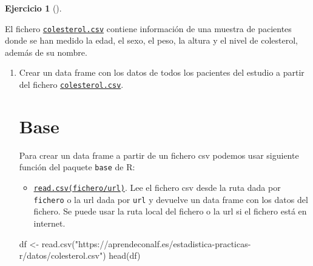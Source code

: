 \documentclass[
  a4paper,
]{scrreport}
\newenvironment{Shaded}{\begin{snugshade}}{\end{snugshade}}
\newcommand{\FunctionTok}[1]{\textcolor[rgb]{0.28,0.35,0.67}{#1}}
\newcommand{\NormalTok}[1]{\textcolor[rgb]{0.00,0.23,0.31}{#1}}
\newcommand{\OtherTok}[1]{\textcolor[rgb]{0.00,0.23,0.31}{#1}}
\newcommand{\StringTok}[1]{\textcolor[rgb]{0.13,0.47,0.30}{#1}}
\providecommand{\tightlist}{%
  \setlength{\itemsep}{0pt}\setlength{\parskip}{0pt}}\usepackage{longtable,booktabs,array}
\theoremstyle{definition}
\newtheorem{exercise}{Ejercicio}[chapter]
\theoremstyle{remark}
\begin{document}
\begin{exercise}[]\protect\hypertarget{exr-preprocesamiento-2}{}\label{exr-preprocesamiento-2}

El fichero \href{datos/colesterol.csv}{\texttt{colesterol.csv}} contiene
información de una muestra de pacientes donde se han medido la edad, el
sexo, el peso, la altura y el nivel de colesterol, además de su nombre.

\begin{enumerate}
\def\labelenumi{\alph{enumi}.}
\item
  Crear un data frame con los datos de todos los pacientes del estudio a
  partir del fichero
  \href{datos/colesterol.csv}{\texttt{colesterol.csv}}.

  \begin{tcolorbox}[enhanced jigsaw, colframe=quarto-callout-tip-color-frame, toprule=.15mm, bottomtitle=1mm, breakable, opacitybacktitle=0.6, toptitle=1mm, colback=white, bottomrule=.15mm, title=\textcolor{quarto-callout-tip-color}{\faLightbulb}\hspace{0.5em}{Solución}, arc=.35mm, left=2mm, titlerule=0mm, rightrule=.15mm, coltitle=black, leftrule=.75mm, opacityback=0, colbacktitle=quarto-callout-tip-color!10!white]

  \section{Base}

  Para crear un data frame a partir de un fichero csv podemos usar
  siguiente función del paquete \texttt{base} de R:

  \begin{itemize}
  \tightlist
  \item
    \href{https://rdrr.io/r/base/read.csv.html}{\texttt{read.csv(fichero/url)}}.
    Lee el fichero csv desde la ruta dada por \texttt{fichero} o la url
    dada por \texttt{url} y devuelve un data frame con los datos del
    fichero. Se puede usar la ruta local del fichero o la url si el
    fichero está en internet.
  \end{itemize}

\begin{Shaded}
\begin{Highlighting}[]
\NormalTok{df }\OtherTok{\textless{}{-}} \FunctionTok{read.csv}\NormalTok{(}\StringTok{"https://aprendeconalf.es/estadistica{-}practicas{-}r/datos/colesterol.csv"}\NormalTok{)}
\FunctionTok{head}\NormalTok{(df)}
\end{Highlighting}
\end{Shaded}


\end{tcolorbox}
\end{enumerate}
\end{exercise}
\end{document}
